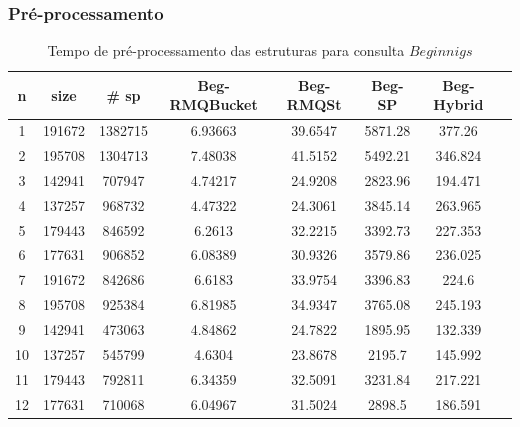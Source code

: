 \documentclass[12pt]{article}
\begin{document}
\subsubsection{Pré-processamento}

\begin{table}
\small
\begin{center}
\begin{tabular}{|c|c|c|c|c|c|c|c|}
\hline
\textbf{n} & \textbf{size} & \textbf{\# sp} & \textbf{Beg-RMQBucket} & \textbf{Beg-RMQSt} & \textbf{Beg-SP} & \textbf{Beg-Hybrid}\\
\hline
1 &  191672 & 1382715 & 6.93663 & 39.6547 & 5871.28 & 377.26\\
\hline
2 & 195708 & 1304713 & 7.48038 & 41.5152 & 5492.21 & 346.824\\
\hline
3 & 142941 & 707947 & 4.74217 & 24.9208 & 2823.96 & 194.471\\
\hline
4 & 137257 & 968732 & 4.47322 & 24.3061 & 3845.14 & 263.965\\
\hline
5 & 179443 & 846592 & 6.2613 & 32.2215 & 3392.73 & 227.353\\
\hline
6 & 177631 & 906852 & 6.08389 & 30.9326 & 3579.86 & 236.025\\
\hline
7 & 191672 & 842686 & 6.6183 & 33.9754 & 3396.83 & 224.6\\
\hline
8 & 195708 & 925384 & 6.81985 & 34.9347 & 3765.08 & 245.193\\
\hline
9 & 142941 & 473063 & 4.84862 & 24.7822 & 1895.95 & 132.339\\
\hline
10 & 137257 & 545799 & 4.6304 & 23.8678 & 2195.7 & 145.992\\
\hline
11 & 179443 & 792811 & 6.34359 & 32.5091 & 3231.84 & 217.221\\
\hline
12 & 177631 & 710068 & 6.04967 & 31.5024 & 2898.5 & 186.591\\
\hline
\end{tabular}
\end{center}
\label{tab:beg_pre_series}
\caption{Tempo de pré-processamento das estruturas para consulta $Beginnigs$}
\end{table}





\appendix
\end{document}
